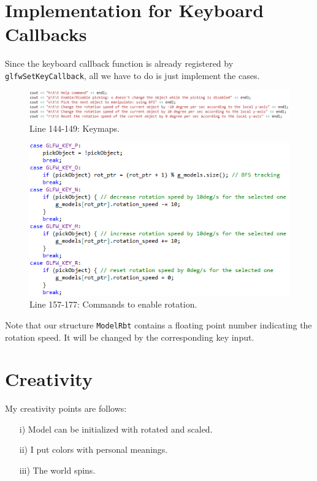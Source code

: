 \documentclass[11pt]{article}
\begin{document}
\section{Implementation for Keyboard Callbacks} \label{sec:5}
Since the keyboard callback function is already registered by \texttt{glfwSetKeyCallback}, all we have to do is just implement the cases.
\begin{figure}[htb]
	\begin{center}
		\includegraphics[width=1.0\linewidth]{tooltip1.png}
	\end{center}
	\caption{Line 144-149: Keymaps.}
\end{figure}
\newpage
\begin{figure}[htb]
	\begin{center}
		\includegraphics[width=1.0\linewidth]{command1.png}
	\end{center}
	\caption{Line 157-177: Commands to enable rotation.}
\end{figure}
Note that our structure \texttt{ModelRbt} contains a floating point number indicating the rotation speed. It will be changed by the corresponding key input.

\section{Creativity} \label{sec:6}
My creativity points are follows:
\begin{itemize}
	\item [i)] Model can be initialized with rotated and scaled.
	\item [ii)] I put colors with personal meanings.
	\item [iii)] The world spins.
\end{itemize}
\end{document}
